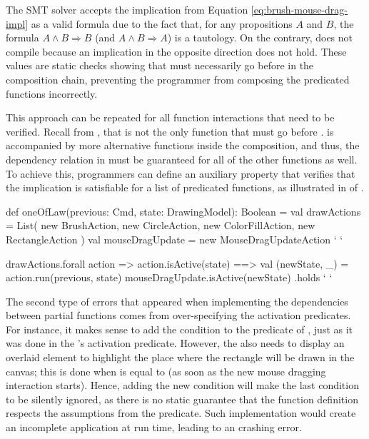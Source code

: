 The \ac{SMT} solver accepts the implication from Equation \ref{eq:brush-mouse-drag-impl} as a valid 
formula due to the fact that, for any propositions $A$ and $B$, the formula $A \wedge B \Rightarrow B$ 
(and $A \wedge B \Rightarrow A$) is a tautology. On the contrary,  does not 
compile because an implication in the opposite direction does not hold. These values are static checks 
showing that  must necessarily go before  in the 
composition chain, preventing the programmer from composing the predicated functions incorrectly.

This approach can be repeated for all function interactions that need to be verified. Recall from 
, that  is not the only function that must 
go before .  is accompanied by more alternative 
functions inside the  composition, and thus, the dependency relation in 
 must be guaranteed for all of the other functions as well. 
To achieve this, programmers can define an auxiliary property that verifies that the implication is 
satisfiable for a list of predicated functions, as illustrated in 
 of 
.

\begin{scala}[label=lst:enforcing-multiple-dependencies, caption=Enforcing dependencies between multiple Predicated Functions]
def oneOfLaw(previous: Cmd, state: DrawingModel): Boolean =
  val drawActions  =  List(
    new BrushAction,
    new CircleAction,
    new ColorFillAction,
    new RectangleAction
  )
  val mouseDragUpdate = new MouseDragUpdateAction ` \label{ln:list-dependencies-init} `

  drawActions.forall { action => 
    action.isActive(state) ==> {
      val (newState, _) = action.run(previous, state)
      mouseDragUpdate.isActive(newState)
    }
  }.holds  ` \label{ln:list-dependencies-end} `
\end{scala}

The second type of errors that appeared when implementing the dependencies between partial functions 
comes from over-specifying the activation predicates. For instance, it makes sense to add the 
 condition to the  predicate of 
, just as it was done in the 's activation predicate.
However, the  also needs to display an overlaid element to highlight the place 
where the rectangle will be drawn in the canvas; this is done when  is 
equal to  (as soon as the new mouse dragging interaction starts). Hence, adding the new 
condition will make the last condition to be silently ignored, as there is no static guarantee that the 
 function definition respects the assumptions from the  predicate. Such 
implementation would create an incomplete application at run time, leading to an crashing error.

